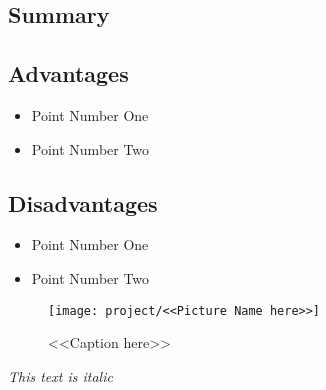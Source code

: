 \subsection{Summary}

\subsection{Advantages}
\begin{itemize}
\item{Point Number One}
\item{Point Number Two}
\end{itemize}

\subsection{Disadvantages}
\begin{itemize}
\item{Point Number One}
\item{Point Number Two}
\end{itemize}


\begin{figure}[H]
\centering
\texttt{[image: project/<<Picture Name here>>]}
\caption{<<Caption here>>}
\label{<<Unique label name here>>}
\end{figure}


\emph{This text is italic} 
